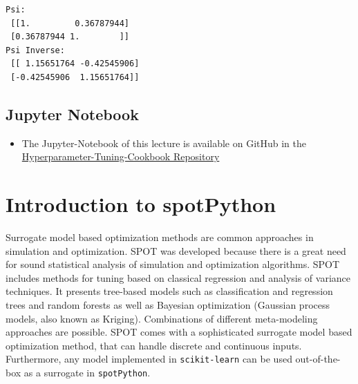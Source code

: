 \documentclass[
  letterpaper,
  DIV=11,
  numbers=noendperiod]{scrreprt}
\providecommand{\tightlist}{%
  \setlength{\itemsep}{0pt}\setlength{\parskip}{0pt}}\usepackage{longtable,booktabs,array}
\begin{document}
\begin{verbatim}
Psi:
 [[1.         0.36787944]
 [0.36787944 1.        ]]
Psi Inverse:
 [[ 1.15651764 -0.42545906]
 [-0.42545906  1.15651764]]
\end{verbatim}

\section{Jupyter Notebook}\label{jupyter-notebook-5}

\begin{tcolorbox}[enhanced jigsaw, coltitle=black, bottomrule=.15mm, breakable, toprule=.15mm, colframe=quarto-callout-note-color-frame, title=\textcolor{quarto-callout-note-color}{\faInfo}\hspace{0.5em}{Note}, colbacktitle=quarto-callout-note-color!10!white, opacityback=0, left=2mm, leftrule=.75mm, colback=white, rightrule=.15mm, bottomtitle=1mm, toptitle=1mm, titlerule=0mm, arc=.35mm, opacitybacktitle=0.6]

\begin{itemize}
\tightlist
\item
  The Jupyter-Notebook of this lecture is available on GitHub in the
  \href{https://github.com/sequential-parameter-optimization/Hyperparameter-Tuning-Cookbook/blob/main/006_num_gp.ipynb}{Hyperparameter-Tuning-Cookbook
  Repository}
\end{itemize}

\end{tcolorbox}

\chapter{Introduction to spotPython}\label{sec-spot}

Surrogate model based optimization methods are common approaches in
simulation and optimization. SPOT was developed because there is a great
need for sound statistical analysis of simulation and optimization
algorithms. SPOT includes methods for tuning based on classical
regression and analysis of variance techniques. It presents tree-based
models such as classification and regression trees and random forests as
well as Bayesian optimization (Gaussian process models, also known as
Kriging). Combinations of different meta-modeling approaches are
possible. SPOT comes with a sophisticated surrogate model based
optimization method, that can handle discrete and continuous inputs.
Furthermore, any model implemented in \texttt{scikit-learn} can be used
out-of-the-box as a surrogate in \texttt{spotPython}.
\end{document}
